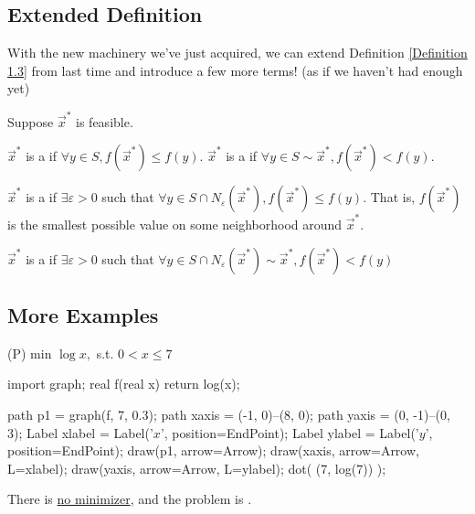 \documentclass{article}
\begin{document}
\subsection{Extended Definition}
With the new machinery we've just acquired, we can extend Definition \ref{Definition 1.3} from last time and introduce a few more terms! (as if we haven't had enough yet)

\begin{definition}
	Suppose $\vec{x}^*$ is feasible. 
	\begin{enumerate}
			\ii $\vec{x}^*$ is a  if $\forall y\in S, f(\vec{x}^*)\le f(y).$ 
			\ii $\vec{x}^*$ is a  if $\forall y\in S\sim\vec{x}^*, f(\vec{x}^*)<f(y).$ 
			
			\ii $\vec{x}^*$ is a  if $\exists \varepsilon>0$ such that $\forall y\in S\cap N_{\varepsilon}(\vec{x}^*), f(\vec{x}^*)\le f(y).$ That is, $f(\vec{x}^*)$ is the smallest possible value on some neighborhood around $\vec{x}^*.$ 

			\ii $\vec{x}^*$ is a  if $\exists \varepsilon>0$ such that $\forall y\in S\cap N_{\varepsilon}(\vec{x}^*)\sim\vec{x}^*, f(\vec{x}^*)< f(y)$
	\end{enumerate}
\end{definition}

\subsection{More Examples}
\begin{example}
	(P) min $\log x,$ s.t. $0<x\le7$
	\begin{center}
		\begin{asy}
			import graph;
			real f(real x) {
				return log(x);
			}

			path p1 = graph(f, 7, 0.3);
			path xaxis = (-1, 0)--(8, 0);
			path yaxis = (0, -1)--(0, 3);
			Label xlabel = Label('$x$', position=EndPoint);
			Label ylabel = Label('$y$', position=EndPoint);
			draw(p1, arrow=Arrow);
			draw(xaxis, arrow=Arrow, L=xlabel);
			draw(yaxis, arrow=Arrow, L=ylabel);
			dot( (7, log(7))  );
		\end{asy}
	\end{center}
	There is \ul{no minimizer}, and the problem is . 
\end{example}
\end{document}
